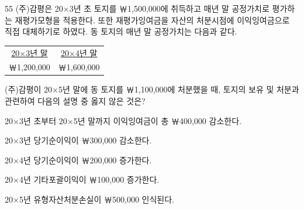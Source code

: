 \begin{question}{55}
(주)감평은 20×3년 초 토지를 ￦1,500,000에 취득하고 매년 말 공정가치로 평가하는 재평가모형을 적용한다. 또한 재평가잉여금을 자산의 처분시점에 이익잉여금으로 직접 대체하기로 하였다. 동 토지의 매년 말 공정가치는 다음과 같다.
\begin{framedtext}
\centering\begin{tabular}{cc}
\uline{20×3년 말} & \uline{20×4년 말} \\
￦1,200,000 & ￦1,600,000
\end{tabular}\par
\end{framedtext}
(주)감평이 20×5년 말에 동 토지를 ￦1,100,000에 처분했을 때, 토지의 보유 및 처분과 관련하여 다음의 설명 중 옳지 않은 것은?
\begin{choices}
  \item 20×3년 초부터 20×5년 말까지 이익잉여금이 총 ￦400,000 감소한다.
  \item 20×3년 당기순이익이 ￦300,000 감소한다.
  \item 20×4년 당기순이익이 ￦200,000 증가한다.
  \item 20×4년 기타포괄이익이 ￦100,000 증가한다.
  \item 20×5년 유형자산처분손실이 ￦500,000 인식된다.
\end{choices}
\end{question}
